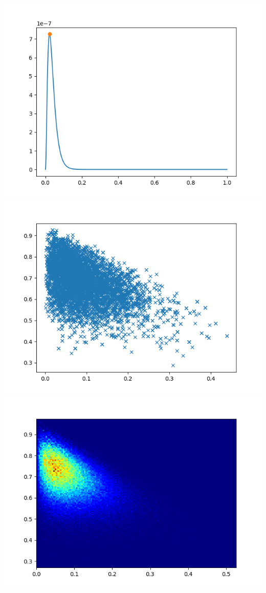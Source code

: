 \documentclass[pt12]{article}
\begin{document}
\newpage

\begin{center}
\includegraphics[scale=0.5]{hip14.png}\\
\includegraphics[scale=0.5]{sc14.png}\\
\includegraphics[scale=0.5]{den14.png}\\
\end{center}
\end{document}
